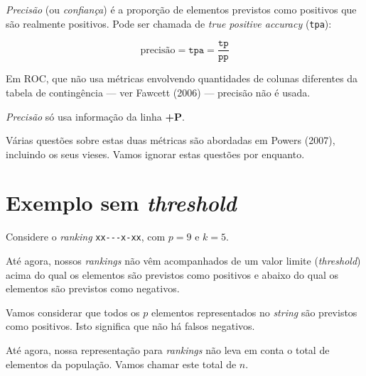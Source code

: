 \documentclass[
  letterpaper,
  DIV=11,
  numbers=noendperiod]{scrreprt}
\begin{document}
\begin{tcolorbox}[enhanced jigsaw, toprule=.15mm, bottomrule=.15mm, coltitle=black, left=2mm, colframe=quarto-callout-note-color-frame, titlerule=0mm, leftrule=.75mm, bottomtitle=1mm, title=\textcolor{quarto-callout-note-color}{\faInfo}\hspace{0.5em}{Precisão}, breakable, rightrule=.15mm, colbacktitle=quarto-callout-note-color!10!white, toptitle=1mm, arc=.35mm, opacitybacktitle=0.6, opacityback=0, colback=white]

\emph{Precisão} (ou \emph{confiança}) é a proporção de elementos
previstos como positivos que são realmente positivos. Pode ser chamada
de \emph{true positive accuracy} (\texttt{tpa}):

\[
\text{precisão} = \texttt{tpa} = \frac{\texttt{tp}}{\texttt{pp}}
\]

Em ROC, que não usa métricas envolvendo quantidades de colunas
diferentes da tabela de contingência --- ver Fawcett (2006) --- precisão
não é usada.

\emph{Precisão} só usa informação da linha \textbf{+P}.

\end{tcolorbox}

Várias questões sobre estas duas métricas são abordadas em Powers
(2007), incluindo os seus vieses. Vamos ignorar estas questões por
enquanto.

\section{\texorpdfstring{Exemplo sem
\emph{threshold}}{Exemplo sem threshold}}\label{exemplo-sem-threshold}

Considere o \emph{ranking} \texttt{xx-\/-\/-x-xx}, com $p = 9$ e
$k = 5$.

Até agora, nossos \emph{rankings} não vêm acompanhados de um valor
limite (\emph{threshold}) acima do qual os elementos são previstos como
positivos e abaixo do qual os elementos são previstos como negativos.

Vamos considerar que todos os $p$ elementos representados no
\emph{string} são previstos como positivos. Isto significa que não há
falsos negativos.

Até agora, nossa representação para \emph{rankings} não leva em conta o
total de elementos da população. Vamos chamar este total de $n$.
\end{document}
